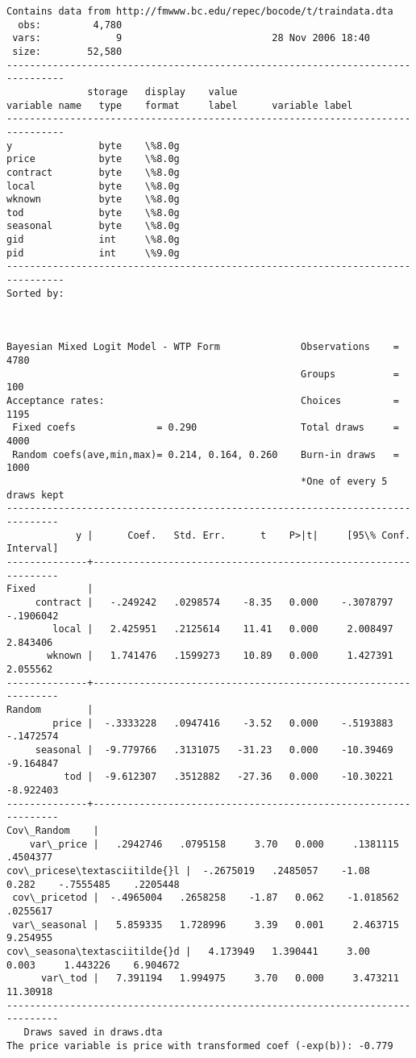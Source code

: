 \documentclass[11pt]{article}
\begin{document}
    \begin{Verbatim}[commandchars=\\\{\}]



Contains data from http://fmwww.bc.edu/repec/bocode/t/traindata.dta
  obs:         4,780
 vars:             9                          28 Nov 2006 18:40
 size:        52,580
--------------------------------------------------------------------------------
              storage   display    value
variable name   type    format     label      variable label
--------------------------------------------------------------------------------
y               byte    \%8.0g
price           byte    \%8.0g
contract        byte    \%8.0g
local           byte    \%8.0g
wknown          byte    \%8.0g
tod             byte    \%8.0g
seasonal        byte    \%8.0g
gid             int     \%8.0g
pid             int     \%9.0g
--------------------------------------------------------------------------------
Sorted by:



Bayesian Mixed Logit Model - WTP Form              Observations    =      4780
                                                   Groups          =       100
Acceptance rates:                                  Choices         =      1195
 Fixed coefs              = 0.290                  Total draws     =      4000
 Random coefs(ave,min,max)= 0.214, 0.164, 0.260    Burn-in draws   =      1000
                                                   *One of every 5 draws kept
-------------------------------------------------------------------------------
            y |      Coef.   Std. Err.      t    P>|t|     [95\% Conf. Interval]
--------------+----------------------------------------------------------------
Fixed         |
     contract |   -.249242   .0298574    -8.35   0.000    -.3078797   -.1906042
        local |   2.425951   .2125614    11.41   0.000     2.008497    2.843406
       wknown |   1.741476   .1599273    10.89   0.000     1.427391    2.055562
--------------+----------------------------------------------------------------
Random        |
        price |  -.3333228   .0947416    -3.52   0.000    -.5193883   -.1472574
     seasonal |  -9.779766   .3131075   -31.23   0.000    -10.39469   -9.164847
          tod |  -9.612307   .3512882   -27.36   0.000    -10.30221   -8.922403
--------------+----------------------------------------------------------------
Cov\_Random    |
    var\_price |   .2942746   .0795158     3.70   0.000     .1381115    .4504377
cov\_pricese\textasciitilde{}l |  -.2675019   .2485057    -1.08   0.282    -.7555485    .2205448
 cov\_pricetod |  -.4965004   .2658258    -1.87   0.062    -1.018562    .0255617
 var\_seasonal |   5.859335   1.728996     3.39   0.001     2.463715    9.254955
cov\_seasona\textasciitilde{}d |   4.173949   1.390441     3.00   0.003     1.443226    6.904672
      var\_tod |   7.391194   1.994975     3.70   0.000     3.473211    11.30918
-------------------------------------------------------------------------------
   Draws saved in draws.dta
The price variable is price with transformed coef (-exp(b)): -0.779



\end{Verbatim}
\end{document}
